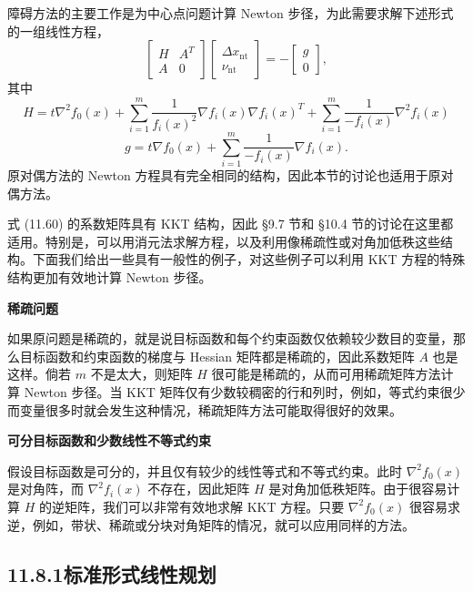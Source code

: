 \documentclass[UTF8, 12pt, fontset=fandol, oneside]{ctexart}
\begin{document}
障碍方法的主要工作是为中心点问题计算 Newton 步径，为此需要求解下述形式的一组线性方程，
\begin{equation}
\begin{bmatrix}
H & A^T\\
A & 0
\end{bmatrix}
\begin{bmatrix}
\Delta x_{\mathrm{nt}}\\
\nu_{\mathrm{nt}}
\end{bmatrix}
=-
\begin{bmatrix}
g\\
0
\end{bmatrix},
\tag{11.60}
\end{equation}
其中
\[
H=t\nabla^2f_0(x)+\sum_{i=1}^m\frac{1}{f_i(x)^2}\nabla f_i(x)\nabla f_i(x)^T+\sum_{i=1}^m\frac{1}{-f_i(x)}\nabla^2f_i(x)
\]
\[
g=t\nabla f_0(x)+\sum_{i=1}^m\frac{1}{-f_i(x)}\nabla f_i(x).
\]
原对偶方法的 Newton 方程具有完全相同的结构，因此本节的讨论也适用于原对偶方法。

式 (11.60) 的系数矩阵具有 KKT 结构，因此 \S 9.7 节和 \S 10.4 节的讨论在这里都适用。特别是，可以用消元法求解方程，以及利用像稀疏性或对角加低秩这些结构。下面我们给出一些具有一般性的例子，对这些例子可以利用 KKT 方程的特殊结构更加有效地计算 Newton 步径。

\noindent\textbf{稀疏问题}

如果原问题是稀疏的，就是说目标函数和每个约束函数仅依赖较少数目的变量，那么目标函数和约束函数的梯度与 Hessian 矩阵都是稀疏的，因此系数矩阵 $A$ 也是这样。倘若 $m$ 不是太大，则矩阵 $H$ 很可能是稀疏的，从而可用稀疏矩阵方法计算 Newton 步径。当 KKT 矩阵仅有少数较稠密的行和列时，例如，等式约束很少而变量很多时就会发生这种情况，稀疏矩阵方法可能取得很好的效果。

\noindent\textbf{可分目标函数和少数线性不等式约束}

假设目标函数是可分的，并且仅有较少的线性等式和不等式约束。此时 $\nabla^2f_0(x)$ 是对角阵，而 $\nabla^2f_i(x)$ 不存在，因此矩阵 $H$ 是对角加低秩矩阵。由于很容易计算 $H$ 的逆矩阵，我们可以非常有效地求解 KKT 方程。只要 $\nabla^2f_0(x)$ 很容易求逆，例如，带状、稀疏或分块对角矩阵的情况，就可以应用同样的方法。

\subsection*{11.8.1\quad 标准形式线性规划}
\end{document}
